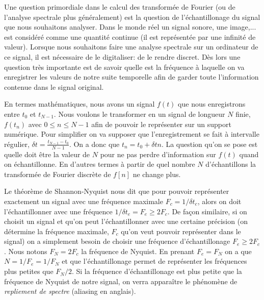 \documentclass[a4paper,12pt]{book}
\begin{document}
Une question primordiale dans le calcul des transformée de Fourier (ou de l'analyse spectrale plus généralement) 
est la question de l'échantillonage du signal que nous souhaitons analyser. Dans le monde réel
un signal sonore, une image,... est considéré comme une quantité continue (il est représentée par 
une infinité de valeur). Lorsque nous souhaitons faire une analyse spectrale sur un ordinateur de ce signal, il est nécessaire
de le digitaliser: de le rendre discret. Dès lors une question très importante est de savoir quelle est la fréquence 
à laquelle on va enregistrer les valeurs de notre suite temporelle afin de garder toute l'information contenue
dans le signal original. 

En termes mathématiques, nous avons un signal $f(t)$ que nous enregistrons entre $t_0$ et $t_{N-1}$.
Nous voulons le transformer en un signal de longueur $N$ finie, $f(t_n)$ avec $0\leq n \leq N-1$
afin de pouvoir le représenter sur un support numérique. Pour simplifier on va supposer
que l'enregistrement se fait à intervalle régulier, $\delta t=\frac{t_{N-1}-t_0}{N-1}$.
On a donc que $t_n=t_0+\delta t n$. 
La question qu'on se pose est quelle doit être la valeur de $N$ pour ne pas 
perdre d'information sur $f(t)$ quand on échantillonne. En d'autres termes
à partir de quel nombre $N$ d'échantillons la transformée de Fourier discrète
de $f[n]$ ne change plus.

Le théorème de Shannon-Nyquist nous dit que pour pouvoir représenter exactement un signal
avec une fréquence maximale $F_c=1/\delta t_c$, alors on doit l'échantillonner avec une fréquence $1/\delta t_e=F_e\geq 2F_c$.
De façon similaire, si on choisit un signal et qu'on peut l'échantillonner avec une certaine précision 
(on détermine la fréquence maximale, $F_c$ qu'on veut pouvoir représenter dans le signal)
on a simplement besoin de choisir une fréquence d'échantillonage $F_e\geq 2F_c$.
Nous notons $F_N=2F_c$ la fréquence de Nyquist. En prenant $F_e=F_N$ on a que $N=1/F_e=1/F_N$ et que l'échantillonage
permet de représenter les fréquences plus petites que $F_N/2$. Si la fréquence d'échantillonage est plus petite
que la fréquence de Nyquist de notre signal, on verra apparaître le phénomène de \textit{repliement de spectre}
(aliasing en anglais).

\end{document}

